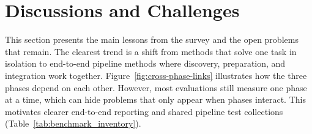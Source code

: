 \documentclass[sigconf]{acmart}
\begin{document}
\section{Discussions and Challenges}
\label{sec:discussion-challenges}

This section presents the main lessons from the survey and the open problems that remain.
The clearest trend is a shift from methods that solve one task in isolation to end-to-end pipeline methods where discovery, preparation, and integration work together.
Figure~\ref{fig:cross-phase-links} illustrates how the three phases depend on each other.
However, most evaluations still measure one phase at a time, which can hide problems that only appear when phases interact.
This motivates clearer end-to-end reporting and shared pipeline test collections (Table~\ref{tab:benchmark_inventory}).
\end{document}
